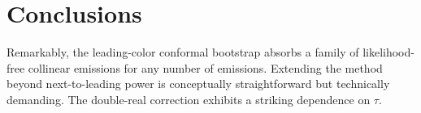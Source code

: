 \section{Conclusions}\label{sec:conclusions}

Remarkably, the leading-color conformal bootstrap absorbs a family of
likelihood-free collinear emissions for any number of emissions.
Extending the method beyond next-to-leading power is conceptually
straightforward but technically demanding. The double-real correction
exhibits a striking dependence on $\tau$.

